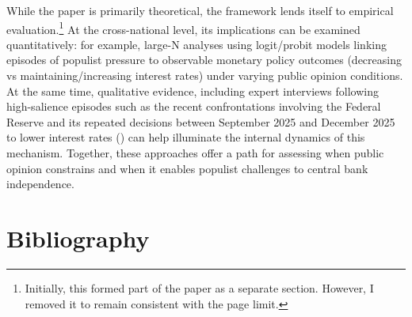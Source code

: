 \documentclass[
  11pt,
  letterpaper,
  DIV=11,
  numbers=noendperiod]{scrartcl}
\begin{document}
While the paper is primarily theoretical, the framework lends itself to
empirical evaluation.\footnote{Initially, this formed part of the paper
  as a separate section. However, I removed it to remain consistent with
  the page limit.} At the cross-national level, its implications can be
examined quantitatively: for example, large-N analyses using
logit/probit models linking episodes of populist pressure to observable
monetary policy outcomes (decreasing vs maintaining/increasing interest
rates) under varying public opinion conditions. At the same time,
qualitative evidence, including expert interviews following
high-salience episodes such as the recent confrontations involving the
Federal Reserve and its repeated decisions between September 2025 and
December 2025 to lower interest rates () can help illuminate the internal dynamics of
this mechanism. Together, these approaches offer a path for assessing
when public opinion constrains and when it enables populist challenges
to central bank independence.

\newpage{}

\section{Bibliography}\label{bibliography}
\end{document}

